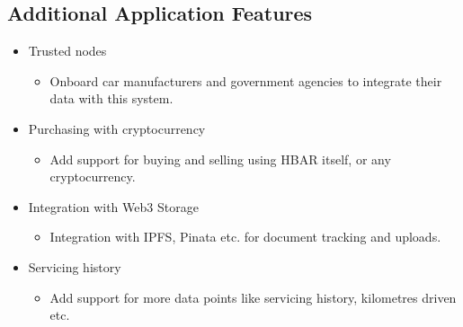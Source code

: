 \documentclass[12pt,a4paper]{article}
\begin{document}
    \subsection{Additional Application Features}
    \begin{itemize}
        \item Trusted nodes
        \begin{itemize}
            \item Onboard car manufacturers and government agencies to integrate their data with this system.
        \end{itemize}

        \item Purchasing with cryptocurrency
        \begin{itemize}
            \item Add support for buying and selling using HBAR itself, or any cryptocurrency.
        \end{itemize}

        \item Integration with Web3 Storage
        \begin{itemize}
            \item Integration with IPFS, Pinata etc. for document tracking and uploads.
        \end{itemize}

        \item Servicing history
        \begin{itemize}
            \item Add support for more data points like servicing history, kilometres driven etc.
        \end{itemize}
    \end{itemize}
\end{document}
